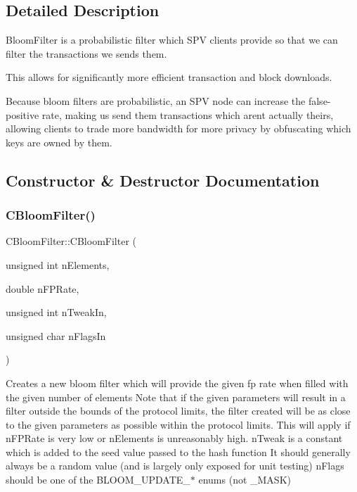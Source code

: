 \subsection{Detailed Description}
Bloom\+Filter is a probabilistic filter which S\+PV clients provide so that we can filter the transactions we sends them.

This allows for significantly more efficient transaction and block downloads.

Because bloom filters are probabilistic, an S\+PV node can increase the false-\/ positive rate, making us send them transactions which aren\textquotesingle{}t actually theirs, allowing clients to trade more bandwidth for more privacy by obfuscating which keys are owned by them. 

\subsection{Constructor \& Destructor Documentation}
\mbox{\label{class_c_bloom_filter_a6395cfcb278ed9cf4ae873549c996f83}} 
\subsubsection{\texorpdfstring{C\+Bloom\+Filter()}{CBloomFilter()}}
{\footnotesize\ttfamily C\+Bloom\+Filter\+::\+C\+Bloom\+Filter (\begin{DoxyParamCaption}\item[{unsigned int}]{n\+Elements,  }\item[{double}]{n\+F\+P\+Rate,  }\item[{unsigned int}]{n\+Tweak\+In,  }\item[{unsigned char}]{n\+Flags\+In }\end{DoxyParamCaption})}

Creates a new bloom filter which will provide the given fp rate when filled with the given number of elements Note that if the given parameters will result in a filter outside the bounds of the protocol limits, the filter created will be as close to the given parameters as possible within the protocol limits. This will apply if n\+F\+P\+Rate is very low or n\+Elements is unreasonably high. n\+Tweak is a constant which is added to the seed value passed to the hash function It should generally always be a random value (and is largely only exposed for unit testing) n\+Flags should be one of the B\+L\+O\+O\+M\+\_\+\+U\+P\+D\+A\+T\+E\+\_\+$\ast$ enums (not \+\_\+\+M\+A\+SK)

